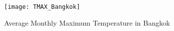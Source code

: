 \begin{figure}[h!]
  \centering
  \texttt{[image: TMAX\_Bangkok]}
  \caption{Average Monthly Maximum Temperature in Bangkok}
  \label{fig:TMAX_bangkok}
\end{figure}












